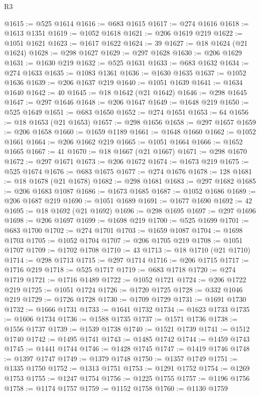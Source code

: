 \begin{lexlean}{R3}
\begin{coremodule}
@1615 := @525 @1614
@1616 := @683 @1615
@1617 := @274 @1616
@1618 := @1613 @1351
@1619 := @1052 @1618
@1621 := @206 @1619 @219
@1622 := @1051 @1621
@1623 := @1617 @1622
@1624 := 39
@1627 := @18 @1624 (@21 @1624)
@1628 := @298 @1627
@1629 := @297 @1628
@1630 := @206 @1629
@1631 := @1630 @219
@1632 := @525 @1631
@1633 := @683 @1632
@1634 := @274 @1633
@1635 := @1083 @1361
@1636 := @1630 @1635
@1637 := @1052 @1636
@1639 := @206 @1637 @219
@1640 := @1051 @1639
@1641 := @1634 @1640
@1642 := 40
@1645 := @18 @1642 (@21 @1642)
@1646 := @298 @1645
@1647 := @297 @1646
@1648 := @206 @1647
@1649 := @1648 @219
@1650 := @525 @1649
@1651 := @683 @1650
@1652 := @274 @1651
@1653 := 64
@1656 := @18 @1653 (@21 @1653)
@1657 := @298 @1656
@1658 := @297 @1657
@1659 := @206 @1658
@1660 := @1659 @1189
@1661 := @1648 @1660
@1662 := @1052 @1661
@1664 := @206 @1662 @219
@1665 := @1051 @1664
@1666 := @1652 @1665
@1667 := 41
@1670 := @18 @1667 (@21 @1667)
@1671 := @298 @1670
@1672 := @297 @1671
@1673 := @206 @1672
@1674 := @1673 @219
@1675 := @525 @1674
@1676 := @683 @1675
@1677 := @274 @1676
@1678 := 128
@1681 := @18 @1678 (@21 @1678)
@1682 := @298 @1681
@1683 := @297 @1682
@1685 := @206 @1683 @1087
@1686 := @1673 @1685
@1687 := @1052 @1686
@1689 := @206 @1687 @219
@1690 := @1051 @1689
@1691 := @1677 @1690
@1692 := 42
@1695 := @18 @1692 (@21 @1692)
@1696 := @298 @1695
@1697 := @297 @1696
@1698 := @206 @1697
@1699 := @1698 @219
@1700 := @525 @1699
@1701 := @683 @1700
@1702 := @274 @1701
@1703 := @1659 @1087
@1704 := @1698 @1703
@1705 := @1052 @1704
@1707 := @206 @1705 @219
@1708 := @1051 @1707
@1709 := @1702 @1708
@1710 := 43
@1713 := @18 @1710 (@21 @1710)
@1714 := @298 @1713
@1715 := @297 @1714
@1716 := @206 @1715
@1717 := @1716 @219
@1718 := @525 @1717
@1719 := @683 @1718
@1720 := @274 @1719
@1721 := @1716 @1489
@1722 := @1052 @1721
@1724 := @206 @1722 @219
@1725 := @1051 @1724
@1726 := @1720 @1725
@1728 := @332 @1046 @219
@1729 := @1726 @1728
@1730 := @1709 @1729
@1731 := @1691 @1730
@1732 := @1666 @1731
@1733 := @1641 @1732
@1734 := @1623 @1733
@1735 := @1606 @1734
@1736 := @1588 @1735
@1737 := @1571 @1736
@1738 := @1556 @1737
@1739 := @1539 @1738
@1740 := @1521 @1739
@1741 := @1512 @1740
@1742 := @1495 @1741
@1743 := @1485 @1742
@1744 := @1459 @1743
@1745 := @1441 @1744
@1746 := @1428 @1745
@1747 := @1419 @1746
@1748 := @1397 @1747
@1749 := @1379 @1748
@1750 := @1357 @1749
@1751 := @1335 @1750
@1752 := @1313 @1751
@1753 := @1291 @1752
@1754 := @1269 @1753
@1755 := @1247 @1754
@1756 := @1225 @1755
@1757 := @1196 @1756
@1758 := @1174 @1757
@1759 := @1152 @1758
@1760 := @1130 @1759

\end{coremodule}
\end{lexlean}
